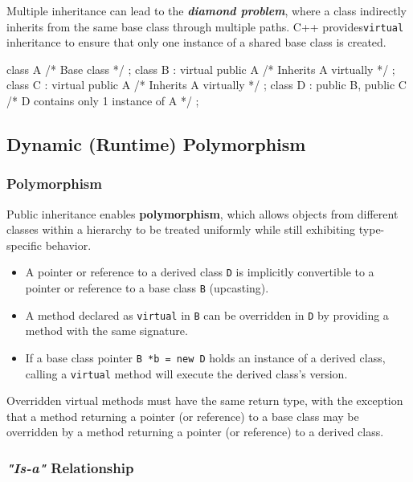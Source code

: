Multiple inheritance can lead to the \textit{\textbf{diamond problem}}, where a class indirectly inherits from the same base class through multiple paths. C++ provides\texttt{virtual} inheritance to ensure that only one instance of a shared base class is created.

\begin{codeblock}[language=C++, numbers=none]
class A { /* Base class */ };
class B : virtual public A { /* Inherits A virtually */ };
class C : virtual public A { /* Inherits A virtually */ };
class D : public B, public C { /* D contains only 1 instance of A */ };
\end{codeblock}

\subsection{Dynamic (Runtime) Polymorphism}

\subsubsection{Polymorphism}

Public inheritance enables \textbf{polymorphism}, which allows objects from different classes within a hierarchy to be treated uniformly while still exhibiting type-specific behavior.

\begin{itemize}
    \item A pointer or reference to a derived class \texttt{D} is implicitly convertible to a pointer or reference to a base class \texttt{B} (upcasting).
    \item A method declared as \texttt{virtual} in \texttt{B} can be overridden in \texttt{D} by providing a method with the same signature.
    \item If a base class pointer \texttt{B *b = new D} holds an instance of a derived class, calling a \texttt{virtual} method will execute the derived class's version.
\end{itemize}

\begin{warningblock}
    Overridden virtual methods must have the same return type, with the exception that a method returning a pointer (or reference) to a base class may be overridden by a method returning a pointer (or reference) to a derived class.
\end{warningblock}

\subsubsection{\textit{"Is-a"} Relationship}

